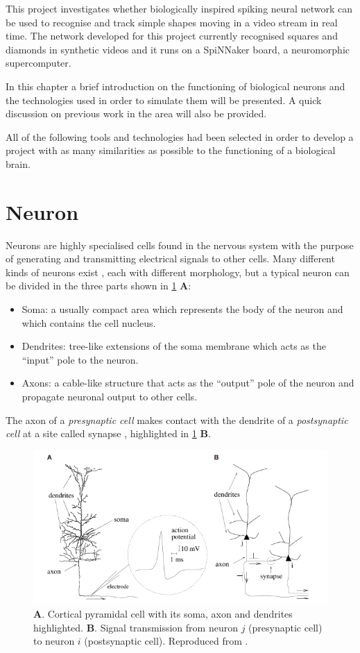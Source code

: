 This project investigates whether biologically inspired spiking neural network can be used to recognise and track simple shapes moving in a video stream in real time. The network developed for this project currently recognised squares and diamonds in synthetic videos and it runs on a SpiNNaker board, a neuromorphic supercomputer. 

In this chapter a brief introduction on the functioning of biological neurons and the technologies used in order to simulate them will be presented. A quick discussion on previous work in the area will also be provided. 

All of the following tools and technologies had been selected in order to develop a project with as many similarities as possible to the functioning of a biological brain. 


\section{Neuron}
Neurons are highly specialised cells found in the nervous system with the purpose of generating and transmitting electrical signals to other cells. Many different kinds of neurons exist \cite{Llinas:2008}, each with different morphology, but a typical neuron can be divided in the three parts shown in \cref{fig:neuron_morphology} \textbf{A}:
\begin{itemize}
    \item Soma: a usually compact area which represents the body of the neuron and which contains the cell nucleus.
    \item Dendrites: tree-like extensions of the soma membrane which acts as the ``input'' pole to the neuron.
    \item Axons: a cable-like structure that acts as the ``output'' pole of the neuron and propagate neuronal output to other cells.
\end{itemize}
The axon of a \textit{presynaptic cell} makes contact with the dendrite of a \textit{postsynaptic cell} at a site called synapse \cite{Gerstner:2014}, highlighted in \cref{fig:neuron_morphology} \textbf{B}.

\begin{figure}[ht]
\centering
\includegraphics[scale=0.6]{images/context/neuron.png}
\caption[Neuron Morphology]{\textbf{A}. Cortical pyramidal cell with its soma, axon and dendrites highlighted. \textbf{B}. Signal transmission from neuron $j$ (presynaptic cell) to neuron $i$ (postsynaptic cell). Reproduced from \cite{Gerstner:2014}.}
\label{fig:neuron_morphology}
\end{figure}

